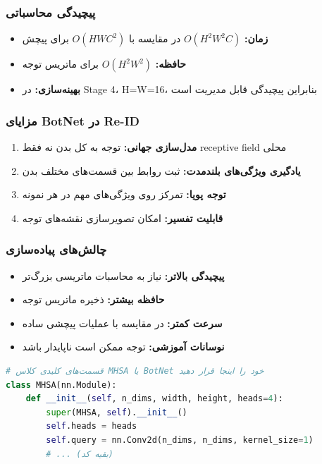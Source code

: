\documentclass[12pt,a4paper]{article}
\theoremstyle{definition}
\begin{document}
\subsubsection*{پیچیدگی محاسباتی}
\begin{itemize}
    \item \textbf{زمان:} $O(H^2 W^2 C)$ در مقایسه با $O(H W C^2)$ برای پیچش
    \item \textbf{حافظه:} $O(H^2 W^2)$ برای ماتریس توجه
    \item \textbf{بهینه‌سازی:} در Stage 4، H=W=16، بنابراین پیچیدگی قابل مدیریت است
\end{itemize}

\subsubsection*{مزایای BotNet در Re-ID}
\begin{enumerate}
    \item \textbf{مدل‌سازی جهانی:} توجه به کل بدن نه فقط receptive field محلی
    \item \textbf{یادگیری ویژگی‌های بلندمدت:} ثبت روابط بین قسمت‌های مختلف بدن
    \item \textbf{توجه پویا:} تمرکز روی ویژگی‌های مهم در هر نمونه
    \item \textbf{قابلیت تفسیر:} امکان تصویرسازی نقشه‌های توجه
\end{enumerate}

\subsubsection*{چالش‌های پیاده‌سازی}
\begin{itemize}
    \item \textbf{پیچیدگی بالاتر:} نیاز به محاسبات ماتریسی بزرگ‌تر
    \item \textbf{حافظه بیشتر:} ذخیره ماتریس توجه
    \item \textbf{سرعت کمتر:} در مقایسه با عملیات پیچشی ساده
    \item \textbf{نوسانات آموزشی:} توجه ممکن است ناپایدار باشد
\end{itemize}

\begin{lstlisting}[language=Python, caption=قطعه کد بلوک MHSA BotNet]
# قسمت‌های کلیدی کلاس MHSA یا BotNet خود را اینجا قرار دهید
class MHSA(nn.Module):
    def __init__(self, n_dims, width, height, heads=4):
        super(MHSA, self).__init__()
        self.heads = heads
        self.query = nn.Conv2d(n_dims, n_dims, kernel_size=1)
        # ... (بقیه کد)
\end{lstlisting}
\end{document}
